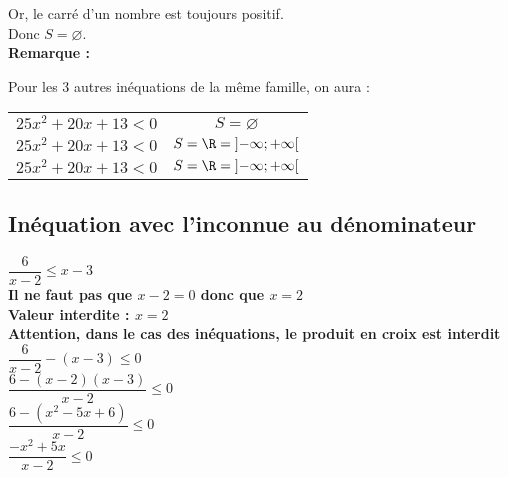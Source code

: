 Or, le carré d'un nombre est toujours positif. \\
Donc $ S = \varnothing $.\\

\textbf{Remarque :}

Pour les 3 autres inéquations de la même famille, on aura :

\begin{tabular}{cc}
$25x^2 + 20x + 13 < 0$ & $S = \varnothing$ \\
$25x^2 + 20x + 13 < 0$ & $ S = \R = \left]-\infty ; +\infty\right[$ \\
$25x^2 + 20x + 13 < 0$ & $ S = \R = \left]-\infty ; +\infty\right[$ \\
\end{tabular}

\newpage 
\subsection{Inéquation avec l'inconnue au dénominateur}

$ \dfrac{6}{x-2} \leqslant x-3 $\\

\textbf{Il ne faut pas que $ x-2 = 0 $ donc que $ x = 2 $}\\

\textbf{Valeur interdite : $ x = 2 $}\\

\textbf{Attention, dans le cas des inéquations, le produit en croix est interdit}\\

$ \dfrac{6}{x-2} - \left(x-3\right) \leqslant 0 $\\

$ \dfrac{6 - \left(x-2\right)\left(x-3\right)}{x-2} \leqslant 0 $\\

$ \dfrac{6 - \left(x^2 - 5x + 6 \right)}{x-2} \leqslant 0 $\\

$ \dfrac{-x^2 + 5x}{x-2} \leqslant 0 $\\

\vspace{.5cm}

\\

